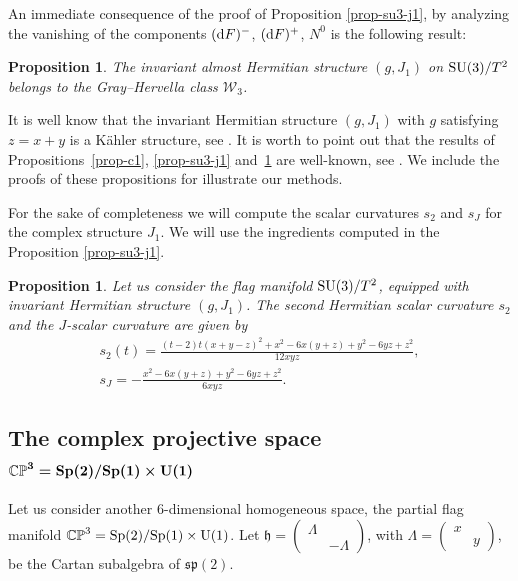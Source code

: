 \documentclass[10pt,a4paper]{amsart}
\numberwithin{equation}{section}
\newtheorem{Proposition}[Theorem]{Proposition}
 { \theoremstyle{definition}
\newtheorem{Definition}[Theorem]{Definition}
\newtheorem{Question}[Theorem]{Question}
\newtheorem*{Notation}{Notation}
\newtheorem{Example}[Theorem]{Example}
\newtheorem{Remark}[Theorem]{Remark} }
\begin{document}
An immediate consequence of the proof of Proposition \ref{prop-su3-j1}, by analyzing the vanishing of the components $({\rm d}F)^{-}$, $({\rm d}F)^{+}$, $N^0$ is the following result:
\begin{Proposition}\label{prop-c3}
The invariant almost Hermitian structure $(g, J_{1})$ on ${\rm SU}(3)/T^2$ belongs to the Gray--Hervella class $\mathcal{W}_{3}$.%
\end{Proposition}
\begin{Remark}
It is well know that the invariant Hermitian structure $(g, J_{1})$ with $g$ satisfying $z=x+y$ is a K\"ahler structure, see \cite{wolf-gray}. It is worth to point out that the results of Propositions~\ref{prop-c1}, \ref{prop-su3-j1} and~\ref{prop-c3} are well-known, see \cite{fu2018twistor}. We include the proofs of these propositions for illustrate our methods.
\end{Remark}

For the sake of completeness we will compute the scalar curvatures $s_2$ and $s_J$ for the complex structure $J_1$. We will use the ingredients computed in the Proposition \ref{prop-su3-j1}.

\begin{Proposition}
Let us consider the flag manifold ${\rm SU}(3)/T^2$, equipped with invariant Hermitian structure $(g, J_{1})$. The second Hermitian scalar curvature $s_2$ and the $J$-scalar curvature are given by
\begin{gather*}
s_{2}(t)=\frac{(t-2) t (x+y-z)^2+x^2-6 x (y+z)+y^2-6 y z+z^2}{12 x y z},
\\
s_{J}=-\frac{x^2-6 x (y+z)+y^2-6 y z+z^2}{6 x y z}.
\end{gather*}
\end{Proposition}



\subsection[The complex projective space \protect{CP\textasciicircum{}{3}=Sp(2)/Sp(1) times U(1)}]
{The complex projective space $\boldsymbol{\mathbb{CP}^{3}={\rm Sp}(2)/{\rm Sp}(1)\times {\rm U}(1)}$}

Let us consider another 6-dimensional homogeneous space, the partial flag manifold $\mathbb{CP}^{3}={\rm Sp}(2)/{\rm Sp}(1)\times {\rm U}(1)$.
Let $\mathfrak{h}=\left(\begin{smallmatrix}
\Lambda&\\
&-\Lambda
\end{smallmatrix}\right)$, with $\Lambda=\left(\begin{smallmatrix}
x&\\
&y
\end{smallmatrix}\right)$, be the Cartan subalgebra of $\mathfrak{sp}(2)$.
\end{document}
